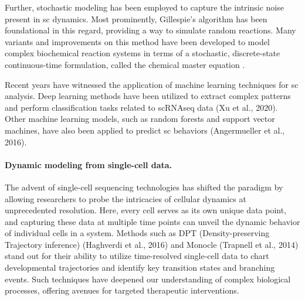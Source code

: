 Further, stochastic modeling has been employed to capture the intrinsic noise present in \acrlong{sc} dynamics. Most prominently, Gillespie's algorithm \citep{gillespie1977exact} has been foundational in this regard, providing a way to simulate random reactions. Many variants and improvements on this method have been developed to model complex biochemical reaction systems \citep{gibson2000efficient} in terms of a stochastic, discrete-state continuous-time formulation, called the chemical master equation \citep{liang2010computational}.

Recent years have witnessed the application of machine learning techniques for \acrlong{sc} analysis. Deep learning methods have been utilized to extract complex patterns and perform classification tasks related to \acrshort{sc}\acrshort{RNAseq} data (Xu et al., 2020). Other machine learning models, such as random forests and support vector machines, have also been applied to predict \acrlong{sc} behaviors (Angermueller et al., 2016).

\paragraph{Dynamic modeling from single-cell data.}

The advent of single-cell sequencing technologies has shifted the paradigm by allowing researchers to probe the intricacies of cellular dynamics at unprecedented resolution. Here, every cell serves as its own unique data point, and capturing these data at multiple time points can unveil the dynamic behavior of individual cells in a system. Methods such as DPT (Density-preserving Trajectory inference) (Haghverdi et al., 2016) and Monocle (Trapnell et al., 2014) stand out for their ability to utilize time-resolved single-cell data to chart developmental trajectories and identify key transition states and branching events. Such techniques have deepened our understanding of complex biological processes, offering avenues for targeted therapeutic interventions.


